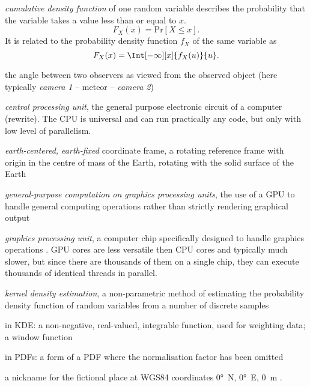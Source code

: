 \begin{description}[labelindent=0mm, leftmargin=40mm]
    \item[CDF]
        \emph{cumulative density function} of one random variable describes the probability that the
        variable takes a value less than or equal to $x$.
        \[
            F_X(x) = \mathrm{Pr}[X \leq x].
        \]
        It is related to the probability density function $f_X$ of the same variable as
        \[
            F_X(x) = \Int[-\infty][x]{f_X(u)}{u}.
        \]
    \item[convergence angle]
        the angle between two observers as viewed from the observed object (here typically \emph{camera 1} -- meteor -- \emph{camera 2})
    \item[CPU]
        \emph{central processing unit}, the general purpose electronic circuit of a computer \cite{...} (rewrite).
        The CPU is universal and can run practically any code, but only with low level of parallelism.
    \item[ECEF]
        \emph{earth-centered, earth-fixed} coordinate frame, a rotating reference frame with origin
        in the centre of mass of the Earth, rotating with the solid surface of the Earth \citep{ecef}
    \item[GPGPU]
        \emph{general-purpose computation on graphics processing units},
        the use of a GPU to handle general computing operations rather than strictly rendering graphical output \citep{techterms}
    \item[GPU]
        \emph{graphics processing unit}, a computer chip specifically designed to handle graphics operations \citep{techterms}.
        GPU cores are less versatile then CPU cores and typically much slower, but since there are thousands of them on a single
        chip, they can execute thousands of identical threads in parallel.
    \item[KDE]
        \emph{kernel density estimation}, a non-parametric method of estimating the probability density function
        of random variables from a number of discrete samples \citep{kde}
    \item[kernel]
        in KDE: a non-negative, real-valued, integrable function, used for weighting data; a window function
    \item[kernel]
        in PDFs: a form of a PDF where the normalisation factor has been omitted
    \item[Null Island]
        a nickname for the fictional place at WGS84 coordinates \ang{0}~N, \ang{0}~E, \SI{0}{\metre} \citep{null-island}.

\end{description}
